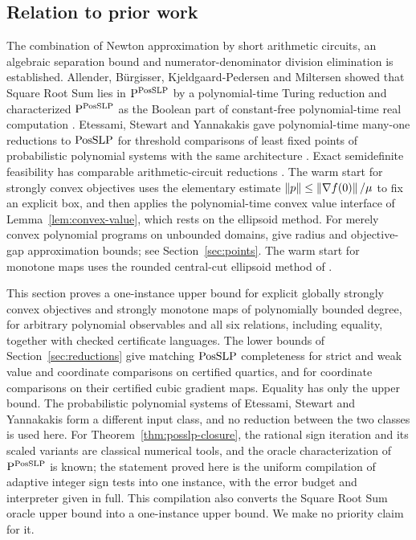 \subsection{Relation to prior work}
\label{sec:upper-prior}

The combination of Newton approximation by short arithmetic circuits, an
algebraic separation bound and numerator-denominator division elimination is
established. Allender, B\"urgisser, Kjeldgaard-Pedersen and Miltersen showed
that Square Root Sum lies in $\mathrm P^{\mathrm{PosSLP}}$ by a polynomial-time
Turing reduction and characterized
$\mathrm P^{\mathrm{PosSLP}}$ as the Boolean part of constant-free polynomial-time
real computation \citep{AllenderEtAl2009}. Etessami, Stewart and Yannakakis
gave polynomial-time many-one reductions to $\mathrm{PosSLP}$ for threshold
comparisons of least fixed points of probabilistic polynomial systems with
the same architecture \citep[Appendix~C]{EtessamiStewartYannakakis2012}.
Exact semidefinite feasibility has comparable arithmetic-circuit reductions
\citep{TarasovVyalyi2008}. The warm start for strongly convex objectives uses
the elementary estimate $\left\lVert p\right\rVert\le\left\lVert\nabla f(0)\right\rVert/\mu$ to fix an explicit
box, and then applies the polynomial-time convex value interface of
Lemma~\ref{lem:convex-value}, which rests on the ellipsoid method.
For merely convex polynomial programs on unbounded domains,
\citet{SlotSteurerWiedmer2025} give radius and objective-gap approximation
bounds; see Section~\ref{sec:points}. The warm start for monotone maps uses
the rounded central-cut ellipsoid method of
\citet[Section~3.2]{GroetschelLovaszSchrijver1988}.

This section proves a one-instance upper bound for explicit globally strongly
convex objectives and strongly monotone maps of polynomially bounded degree,
for arbitrary polynomial observables and all six relations, including
equality, together with checked certificate languages. The lower bounds of
Section~\ref{sec:reductions} give matching $\mathrm{PosSLP}$ completeness for strict
and weak value and coordinate comparisons on certified quartics, and for
coordinate comparisons on their certified cubic gradient maps. Equality has
only the upper bound. The probabilistic polynomial systems of
Etessami, Stewart and Yannakakis form a different input class, and no
reduction between the two classes is used here. For Theorem~\ref{thm:posslp-closure}, the rational sign
iteration and its scaled variants are classical numerical tools, and the
oracle characterization of $\mathrm P^{\mathrm{PosSLP}}$ is known; the statement
proved here is the uniform compilation of adaptive integer sign tests into
one instance, with the error budget and interpreter given in full. This
compilation also converts the Square Root Sum oracle upper bound into a
one-instance upper bound. We make no priority claim for it.
